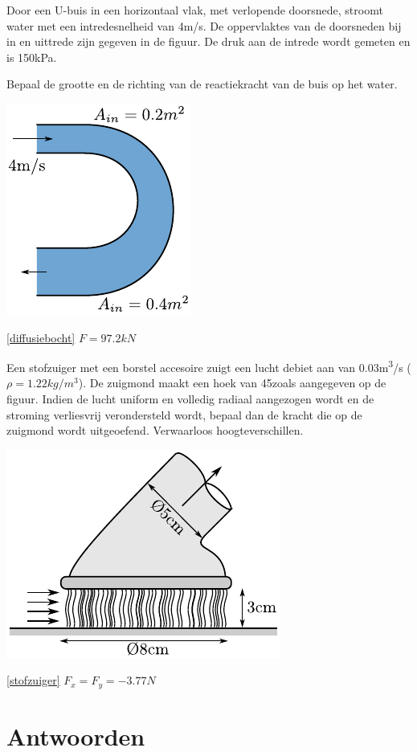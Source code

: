 \begin{toepassing}[*]
	\label{diffusiebocht}
Door een U-buis in een horizontaal vlak, met verlopende doorsnede, stroomt water met een intredesnelheid van 4m/s. De oppervlaktes van de doorsneden bij in en uittrede zijn gegeven in de figuur. De druk aan de intrede wordt gemeten en is 150\unit{kPa}.
		
Bepaal de grootte en de richting van de reactiekracht van de buis op het water.

	\centering
	\includegraphics{fig/behoudsvergelijkingen/diffusiebocht}
\end{toepassing}
\begin{antwoord}{\ref{diffusiebocht}}
	$F = 97.2\unit{kN}$
\end{antwoord}
\begin{toepassing}[*]
	\label{stofzuiger}
Een stofzuiger met een borstel accesoire zuigt een lucht debiet aan van 0.03\unit{m^3/s} ($\rho=1.22\unit{kg/m^3}$). De zuigmond maakt een hoek van 45\deg zoals aangegeven op de figuur. Indien de lucht uniform en volledig radiaal aangezogen wordt en de stroming verliesvrij verondersteld wordt, bepaal dan de kracht die op de zuigmond wordt uitgeoefend. Verwaarloos hoogteverschillen.

	\centering
	\includegraphics{fig/behoudsvergelijkingen/stofzuiger}
\end{toepassing}
\begin{antwoord}{\ref{stofzuiger}}
	$F_x = F_y = -3.77\unit{N}$
\end{antwoord}	
\section*{Antwoorden}
	\begin{multicols}{2}
	\end{multicols}